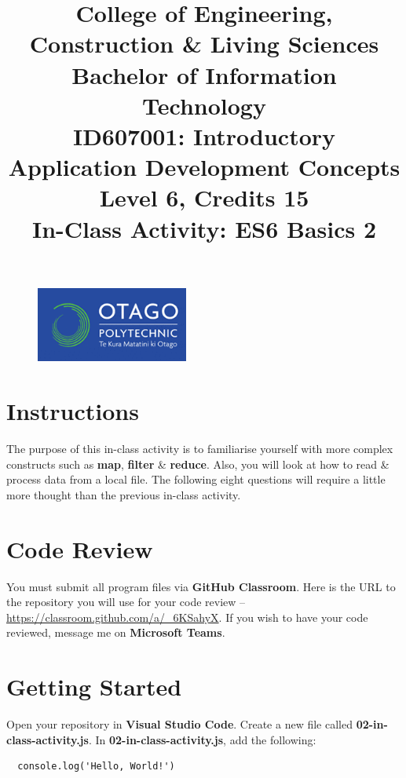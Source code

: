\documentclass{article}
\author{}
\begin{document}
\begin{figure}
  \centering
  \includegraphics[width=50mm]{../img/logo.png}
\end{figure}

\title{College of Engineering, Construction \& Living Sciences\\Bachelor of Information Technology\\ID607001: Introductory Application Development Concepts\\Level 6, Credits 15\\\textbf{In-Class Activity: ES6 Basics 2}}
\date{}
\maketitle

\section*{Instructions}
The purpose of this in-class activity is to familiarise yourself with more complex constructs such as \textbf{map}, \textbf{filter} \& \textbf{reduce}. Also, you will look at how to read \& process data from a local file. The following eight questions will require a little more thought than the previous in-class activity.

\section*{Code Review}
You must submit all program files via \textbf{GitHub Classroom}. Here is the URL to the repository you will use for your code review – \href{https://classroom.github.com/a/\_6KSahyX}{https://classroom.github.com/a/\_6KSahyX}. If you wish to have your code reviewed, message me on \textbf{Microsoft Teams}.

\section*{Getting Started}
Open your repository in \textbf{Visual Studio Code}. Create a new file called \textbf{02-in-class-activity.js}. In \textbf{02-in-class-activity.js}, add the following: 

\begin{verbatim}
  console.log('Hello, World!')
\end{verbatim}
\end{document}
